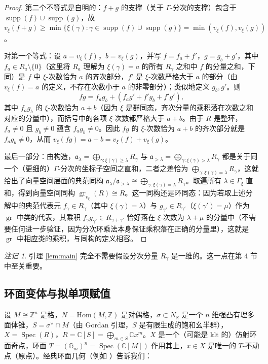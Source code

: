 \documentclass[11pt,a4paper]{article}
\theoremstyle{definition}
\theoremstyle{remark}
\newtheorem{remark}[theorem]{注记}
\DeclareMathOperator{\Spec}{Spec}
\DeclareMathOperator{\gr}{gr}
\DeclareMathOperator{\supp}{supp}
\newcommand{\C}{\mathbb{C}}
\newcommand{\Z}{\mathbb{Z}}
\newcommand{\R}{\mathbb{R}}
\newcommand{\Gm}{\mathbb{G}_m}
\begin{document}
\begin{proof}
第二个不等式是自明的：$f+g$ 的支撑（关于 $\Gamma$-分次的支撑）包含于 $\supp(f)\cup\supp(g)$，故 $v_\xi(f+g)\ge \min\{\xi(\gamma):\gamma\in\supp(f)\cup\supp(g)\}=\min(v_\xi(f),v_\xi(g))$。

对第一个等式：设 $a=v_\xi(f)$，$b=v_\xi(g)$，并写 $f=f_a+f'$，$g=g_b+g'$，其中 $f_a\in R_a\setminus\{0\}$（这里将 $R_a$ 理解为 $\xi(\gamma)=a$ 的所有 $R_\gamma$ 之和中 $f$ 的分量之和，下同）是 $f$ 中 $\xi$-次数恰为 $a$ 的齐次部分，$f'$ 是 $\xi$-次数严格大于 $a$ 的部分（由 $v_\xi(f)=a$ 的定义，不存在次数小于 $a$ 的非零部分）；类似地定义 $g_b,g'$。则
\[
fg = f_ag_b + (f_ag'+f'g_b+f'g'),
\]
其中 $f_ag_b$ 的 $\xi$-次数恰为 $a+b$（因为 $\xi$ 是群同态，齐次分量的乘积落在次数之和对应的分量中），而括号中的各项 $\xi$-次数都严格大于 $a+b$。由于 $R$ 是整环，$f_a\neq0$ 且 $g_b\neq0$ 蕴含 $f_ag_b\neq0$。因此 $fg$ 的 $\xi$-次数恰为 $a+b$ 的齐次部分就是 $f_ag_b\neq0$，从而 $v_\xi(fg)=a+b=v_\xi(f)+v_\xi(g)$。

最后一部分：由构造，$\mathfrak a_\lambda=\bigoplus_{\gamma:\xi(\gamma)\ge\lambda}R_\gamma$ 与 $\mathfrak a_{>\lambda}=\bigoplus_{\gamma:\xi(\gamma)>\lambda}R_\gamma$ 都是关于同一个（更细的）$\Gamma$-分次的坐标子空间之直和，二者之差恰为 $\bigoplus_{\gamma:\xi(\gamma)=\lambda}R_\gamma$，这就给出了向量空间层面的典范同构 $\mathfrak a_\lambda/\mathfrak a_{>\lambda}\cong \bigoplus_{\gamma:\xi(\gamma)=\lambda}R_\gamma$。取遍所有 $\lambda\in\Gamma_\xi$ 直和，得到向量空间同构 $\gr_{v_\xi}(R)\cong R$。这一同构还是环同态：因为若取上述分解中的典范代表元 $f_\gamma\in R_\gamma$（其中 $\xi(\gamma)=\lambda$）与 $g_{\gamma'}\in R_{\gamma'}$（$\xi(\gamma')=\mu$）作为 $\gr$ 中类的代表，其乘积 $f_\gamma g_{\gamma'}\in R_{\gamma+\gamma'}$ 恰好落在 $\xi$-次数为 $\lambda+\mu$ 的分量中（不需要任何进一步验证，因为分次环乘法本身保证乘积落在正确的分量里），这就是 $\gr$ 中相应类的乘积，与同构的定义相容。
\end{proof}

\begin{remark}
引理 \ref{lem:main} 完全不需要假设分次分量 $R_\gamma$ 是一维的。这一点在第 4 节中至关重要。
\end{remark}

\subsection{环面变体与拟单项赋值}

设 $M\cong\Z^n$ 是格，$N=\mathrm{Hom}(M,\Z)$ 是对偶格，$\sigma\subset N_\R$ 是一个 $n$ 维强凸有理多面体锥，$S=\sigma^\vee\cap M$（由 Gordan 引理，$S$ 是有限生成的饱和幺半群），$X=\Spec(R)$，$R=\C[S]=\bigoplus_{m\in S}\C x^m$。$X$ 是一个（可能是 klt 的）仿射环面奇点，环面 $T=(\Gm)^n=\Spec(\C[M])$ 作用其上，$x\in X$ 是唯一的 $T$-不动点（原点）。经典环面几何（例如 \cite{CLS2011}）告诉我们：
\end{document}
